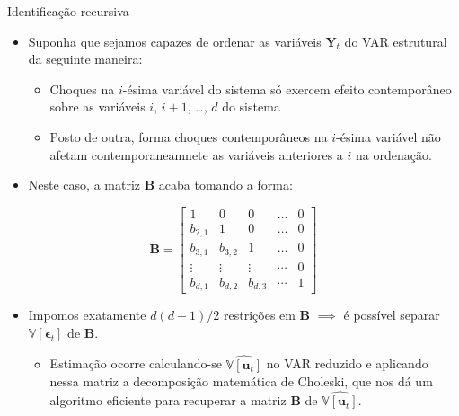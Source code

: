 \documentclass[11pt]{beamer}
\begin{document}
\begin{frame}{Identificação recursiva}
	\begin{itemize}
		\item 
	Suponha que sejamos capazes de ordenar as variáveis $\boldsymbol{Y}_t$ do VAR estrutural da seguinte maneira:
	\begin{itemize}
		\item Choques na $i$-ésima variável do sistema só exercem efeito contemporâneo sobre as variáveis $i$, $i+1$, \ldots, $d$ do sistema
		\item  Posto de outra, forma choques contemporâneos na $i$-ésima variável não afetam contemporaneamnete as variáveis anteriores a $i$ na ordenação.
	\end{itemize}
		\item Neste caso, a matriz $\boldsymbol{B}$ acaba tomando a forma:
		
	\end{itemize}
	
		$$\boldsymbol{B}  = \begin{bmatrix}
		1 & 0 & 0 & \ldots & 0 \\
		b_{2,1} & 1 & 0 & \ldots & 0 \\
		b_{3,1} & b_{3,2} & 1 & \ldots & 0 \\
		\vdots &   \vdots &   \vdots &   \cdots&  0 \\
		b_{d,1} & b_{d,2} & b_{d,3} & \cdots & 1
	\end{bmatrix}$$
	\begin{itemize}
		\item Impomos exatamente $d(d-1)/2$ restrições em $\boldsymbol{B}$ $\implies$ é possível separar $\mathbb{V}[\boldsymbol{\epsilon}_t]$ de $\boldsymbol{B}$.
		\begin{itemize}
			\item Estimação ocorre calculando-se $\widehat{\mathbb{V}[\boldsymbol{u}_t]}$ no VAR reduzido e aplicando nessa matriz {\color{blue}a decomposição matemática de Choleski}, que nos dá um algoritmo eficiente para recuperar a matriz $\boldsymbol{B}$ de $\widehat{\mathbb{V}[\boldsymbol{u}_t]}$.
		\end{itemize}
	\end{itemize}
\end{frame}
\end{document}

